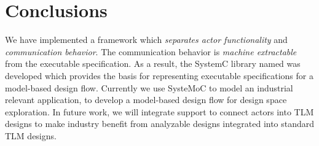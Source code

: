 \section{Conclusions}\label{sec:conclusions}

We have implemented a framework which \emph{separates actor functionality} and \emph{communication behavior}.
The communication behavior is \emph{machine extractable} from the executable specification.
As a result, the SystemC library named \SysteMoC{} was developed which provides the basis for representing executable specifications for a model-based design flow.
Currently we use SysteMoC to model an industrial relevant application, to develop a model-based design flow for design space exploration.
In future work, we will integrate support to connect \SysteMoC{} actors into TLM designs to make industry benefit from analyzable \SysteMoC{} designs integrated into standard TLM designs.

